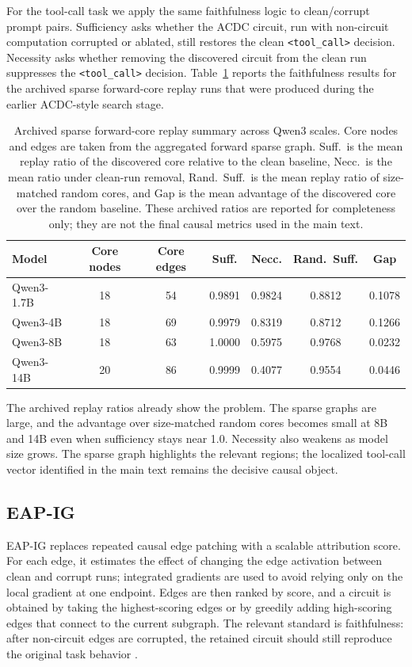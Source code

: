 For the tool-call task we apply the same faithfulness logic to clean/corrupt
prompt pairs.
Sufficiency asks whether the ACDC circuit, run with non-circuit computation
corrupted or ablated, still restores the clean \texttt{<tool\_call>} decision.
Necessity asks whether removing the discovered circuit from the clean run
suppresses the \texttt{<tool\_call>} decision.
Table~\ref{tab:appendix-acdc-faithfulness} reports the faithfulness results
for the archived sparse forward-core replay runs that were produced during the
earlier ACDC-style search stage.

\begin{table}[h]
  \centering
  \small
  \caption{Archived sparse forward-core replay summary across Qwen3 scales.
  Core nodes and edges are taken from the aggregated forward sparse graph.
  Suff.\ is the mean replay ratio of the discovered core relative to the clean
  baseline, Necc.\ is the mean ratio under clean-run removal, Rand.\ Suff.\ is
  the mean replay ratio of size-matched random cores, and Gap is the mean
  advantage of the discovered core over the random baseline. These archived
  ratios are reported for completeness only; they are not the final causal
  metrics used in the main text.}
  \label{tab:appendix-acdc-faithfulness}
  \begin{tabular}{lcccccc}
  \toprule
  Model & Core nodes & Core edges & Suff. & Necc. & Rand.\ Suff. & Gap \\
  \midrule
  Qwen3-1.7B & 18 & 54 & 0.9891 & 0.9824 & 0.8812 & 0.1078 \\
  Qwen3-4B & 18 & 69 & 0.9979 & 0.8319 & 0.8712 & 0.1266 \\
  Qwen3-8B & 18 & 63 & 1.0000 & 0.5975 & 0.9768 & 0.0232 \\
  Qwen3-14B & 20 & 86 & 0.9999 & 0.4077 & 0.9554 & 0.0446 \\
  \bottomrule
\end{tabular}
\end{table}

The archived replay ratios already show the problem. The sparse graphs are
large, and the advantage over size-matched random cores becomes small at 8B
and 14B even when sufficiency stays near 1.0. Necessity also weakens as model
size grows. The sparse graph highlights the relevant regions; the localized tool-call
vector identified in the main text remains the decisive causal object.

\subsection{EAP-IG}
\label{appendix:circuit:eap}
EAP-IG \citep{syed2023attribution} replaces repeated causal edge patching with
a scalable attribution score.
For each edge, it estimates the effect of changing the edge activation between
clean and corrupt runs; integrated gradients are used to avoid relying only on
the local gradient at one endpoint.
Edges are then ranked by score, and a circuit is obtained by taking the
highest-scoring edges or by greedily adding high-scoring edges that connect to
the current subgraph.
The relevant standard is faithfulness: after non-circuit edges are corrupted,
the retained circuit should still reproduce the original task behavior
\citep{hanna2024faithfulness}.

